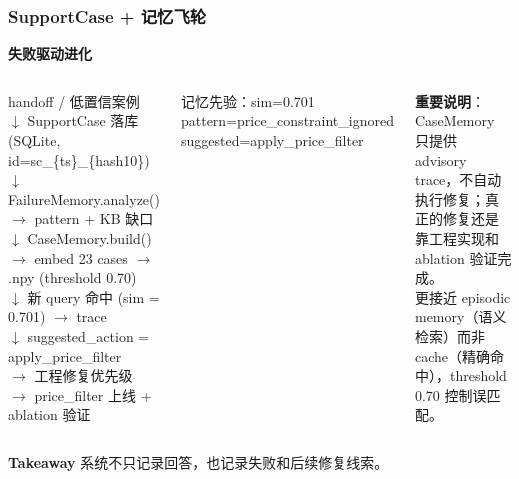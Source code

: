 \documentclass[aspectratio=169,10pt]{beamer}
\newcommand{\takeaway}[1]{%
  \vfill%
  \begin{tcolorbox}[
    colback=Ctakebg, colframe=Ctakebg,
    arc=0pt, boxrule=0pt,
    left=7pt, right=7pt, top=4pt, bottom=4pt,
    width=\linewidth, nobeforeafter
  ]%
    {\scriptsize\color{white}\textbf{Takeaway}\enspace%
     \color{white!88!Ctakebg}#1}%
  \end{tcolorbox}%
}
\begin{document}
\begin{frame}
\frametitle{SupportCase + 记忆飞轮}

{\small\bfseries\color{Cmuted}失败驱动进化}\\[0.08cm]
\begin{columns}[T]
\begin{tcolorbox}[tcgray, title={\color{Ctextdark}飞轮流程}]
{\fontsize{7.5}{10}\selectfont\ttfamily\color{Ctextmain}
handoff / 低置信案例\\[0.15em]
\quad$\downarrow$ SupportCase 落库 (SQLite, id=sc\_\{ts\}\_\{hash10\})\\[0.1em]
\quad$\downarrow$ FailureMemory.analyze()\\
\quad\quad $\rightarrow$ pattern + KB 缺口\\[0.1em]
\quad$\downarrow$ CaseMemory.build()\\
\quad\quad $\rightarrow$ embed 23 cases $\rightarrow$ .npy (threshold 0.70)\\[0.1em]
\quad$\downarrow$ 新 query 命中 (sim = 0.701) $\rightarrow$ trace\\[0.1em]
\quad$\downarrow$ suggested\_action = apply\_price\_filter\\
\quad\quad $\rightarrow$ 工程修复优先级\\
\quad\quad $\rightarrow$ price\_filter 上线 + ablation 验证
}
\end{tcolorbox}

\begin{tcolorbox}[tcpurple, title={\color{purple!60}实测 trace 示例}]
{\fontsize{8}{10}\selectfont\ttfamily\color{purple!80!black}
记忆先验：sim=0.701\\
pattern=price\_constraint\_ignored\\
suggested=apply\_price\_filter
}
\end{tcolorbox}
\vspace{0.2cm}
\begin{tcolorbox}[tcblue]
\small
\textbf{重要说明}：CaseMemory 只提供 advisory trace，不自动执行修复；真正的修复还是靠工程实现和 ablation 验证完成。\\[0.2em]
更接近 episodic memory（语义检索）而非 cache（精确命中），threshold 0.70 控制误匹配。
\end{tcolorbox}
\end{columns}

\takeaway{系统不只记录回答，也记录失败和后续修复线索。}
\end{frame}
\end{document}
